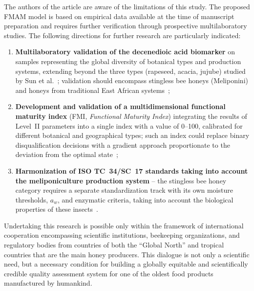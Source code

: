 The authors of the article are aware of the limitations of this
study. The proposed FMAM model is based on empirical data available
at the time of manuscript preparation and requires further
verification through prospective multilaboratory studies.
The following directions for further research are particularly
indicated:

\begin{enumerate}
    \item \textbf{Multilaboratory validation of the decenedioic
          acid biomarker} on samples representing the global
          diversity of botanical types and production systems,
          extending beyond the three types (rapeseed, acacia,
          jujube) studied by Sun et al.~\cite{sun2021}; validation
          should encompass stingless bee honeys (Meliponini)
          and honeys from traditional East African
          systems~\cite{tadele2025};

    \item \textbf{Development and validation of a multidimensional
          functional maturity index} (FMI,
          \textit{Functional Maturity Index}) integrating the
          results of Level~II parameters into a single index
          with a value of 0--100, calibrated for different
          botanical and geographical types; such an index could
          replace binary disqualification decisions with a
          gradient approach proportionate to the deviation from
          the optimal state~\cite{zhang2021,guo2020,sun2021};

    \item \textbf{Harmonization of ISO TC~34/SC~17 standards
          taking into account the meliponiculture production
          system} -- the stingless bee honey category requires
          a separate standardization track with its own moisture
          thresholds, $a_w$, and enzymatic criteria, taking
          into account the biological properties of these
          insects~\cite{stinglessyeastbrazil2021,stinglesswjava2024}.
\end{enumerate}

Undertaking this research is possible only within the framework
of international cooperation encompassing scientific institutions,
beekeeping organizations, and regulatory bodies from countries of
both the ``Global North'' and tropical countries that are the
main honey producers. This dialogue is not only a scientific need,
but a necessary condition for building a globally equitable and
scientifically credible quality assessment system for one of the
oldest food products manufactured by humankind.
